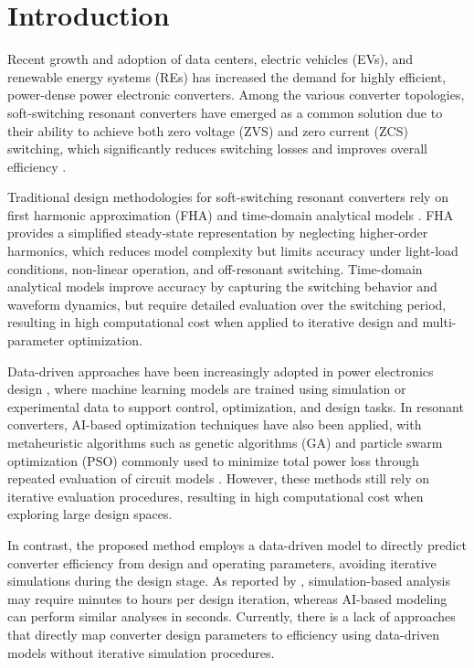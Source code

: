 \section{Introduction} \label{sec:introduction}

Recent growth and adoption of data centers, electric vehicles (EVs), and renewable energy systems (REs) has increased the demand for highly efficient, power-dense power electronic converters. Among the various converter topologies, soft-switching resonant converters have emerged as a common solution due to their ability to achieve both zero voltage (ZVS) and zero current (ZCS) switching, which significantly reduces switching losses and improves overall efficiency \cite{RezaHasanzadehAghdam2026, Chakraborty2019}.

Traditional design methodologies for soft-switching resonant converters rely on first harmonic approximation (FHA) and time-domain analytical models \cite{Jung2013}. FHA provides a simplified steady-state representation by neglecting higher-order harmonics, which reduces model complexity but limits accuracy under light-load conditions, non-linear operation, and off-resonant switching. Time-domain analytical models improve accuracy by capturing the switching behavior and waveform dynamics, but require detailed evaluation over the switching period, resulting in high computational cost when applied to iterative design and multi-parameter optimization.

Data-driven approaches have been increasingly adopted in power electronics design \cite{McCluskey2022, Bahrami2023}, where machine learning models are trained using simulation or experimental data to support control, optimization, and design tasks. In resonant converters, AI-based optimization techniques have also been applied, with metaheuristic algorithms such as genetic algorithms (GA) and particle swarm optimization (PSO) commonly used to minimize total power loss through repeated evaluation of circuit models \cite{Zhao2021, Tang2025}. However, these methods still rely on iterative evaluation procedures, resulting in high computational cost when exploring large design spaces.

In contrast, the proposed method employs a data-driven model to directly predict converter efficiency from design and operating parameters, avoiding iterative simulations during the design stage. As reported by \cite{GAO2023}, simulation-based analysis may require minutes to hours per design iteration, whereas AI-based modeling can perform similar analyses in seconds. Currently, there is a lack of approaches that directly map converter design parameters to efficiency using data-driven models without iterative simulation procedures.

